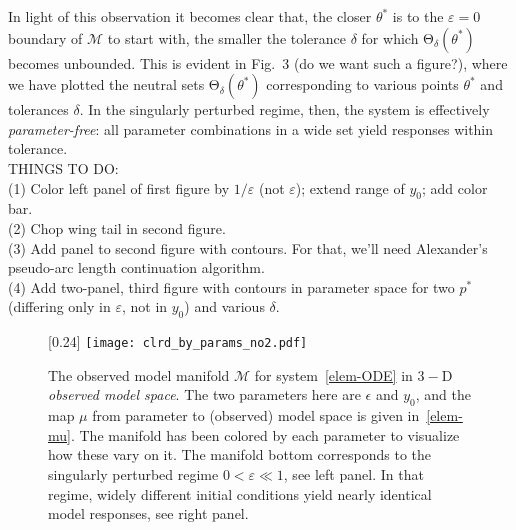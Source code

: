 \documentclass{article}
\newcommand{\eps}{\varepsilon}
\newcommand{\p}{\theta}
\newcommand{\omr}{\mu}
\newcommand{\omm}{\mathcal{M}}
\newcommand{\ps}{\mathrm{\Theta}}
\begin{document}
In light of this observation it becomes clear that, the closer $\p^*$ is to the $\eps = 0$ boundary of $\omm$ to start with, the smaller the tolerance $\delta$ for which $\ps_\delta(\p^*)$ becomes unbounded.
This is evident in Fig.~3 (do we want such a figure?), where we have plotted the neutral sets $\ps_\delta(\p^*)$ corresponding to various points $\p^*$ and tolerances $\delta$.
In the singularly perturbed regime, then, the system is effectively \emph{parameter-free}: all parameter combinations in a wide set yield responses within tolerance.\\

THINGS TO DO:\\
(1) Color left panel of first figure by $1/\eps$ (not $\eps$); extend range of $y_0$; add color bar.\\
(2) Chop wing tail in second figure.\\
(3) Add panel to second figure with contours. For that, we'll need Alexander's pseudo-arc length continuation algorithm.\\
(4) Add two-panel, third figure with contours in parameter space for two $p^*$ (differing only in $\eps$, not in $y_0$) and various $\delta$.



%
\begin{figure}[t]
\scalebox{0.24}[0.24]{
\texttt{[image: clrd\_by\_params\_no2.pdf]}
}
\caption{\label{f.elem.ex.1}
The observed model manifold $\omm$ for system~\eqref{elem-ODE} in $3-$D \emph{observed model space}. The two parameters here are $\epsilon$ and $y_0$, and the map $\omr$ from 
parameter to (observed) model space is given in~\eqref{elem-mu}. The manifold has been colored by each parameter to visualize how these vary on it. The manifold bottom corresponds to the singularly perturbed regime $0 < \eps \ll 1$, see left panel. In that regime, widely different initial conditions yield nearly identical model responses, see right panel.}
\end{figure}
%
\end{document}
